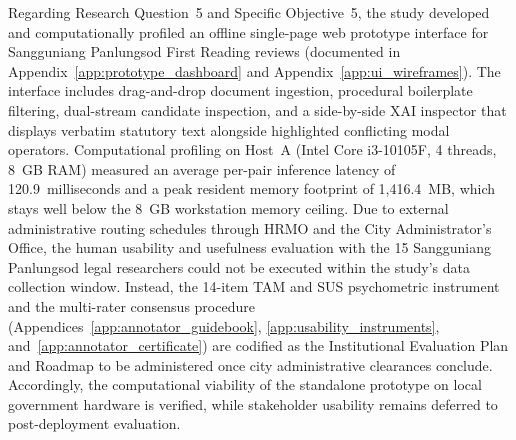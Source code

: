 Regarding Research Question~5 and Specific Objective~5, the study developed and computationally profiled an offline single-page web prototype interface for Sangguniang Panlungsod First Reading reviews (documented in Appendix~\ref{app:prototype_dashboard} and Appendix~\ref{app:ui_wireframes}). The interface includes drag-and-drop document ingestion, procedural boilerplate filtering, dual-stream candidate inspection, and a side-by-side XAI inspector that displays verbatim statutory text alongside highlighted conflicting modal operators. Computational profiling on Host~A (Intel Core i3-10105F, 4 threads, 8~GB RAM) measured an average per-pair inference latency of 120.9~milliseconds and a peak resident memory footprint of 1,416.4~MB, which stays well below the 8~GB workstation memory ceiling. Due to external administrative routing schedules through HRMO and the City Administrator's Office, the human usability and usefulness evaluation with the 15 Sangguniang Panlungsod legal researchers could not be executed within the study's data collection window. Instead, the 14-item TAM and SUS psychometric instrument and the multi-rater consensus procedure (Appendices~\ref{app:annotator_guidebook}, \ref{app:usability_instruments}, and~\ref{app:annotator_certificate}) are codified as the Institutional Evaluation Plan and Roadmap to be administered once city administrative clearances conclude. Accordingly, the computational viability of the standalone prototype on local government hardware is verified, while stakeholder usability remains deferred to post-deployment evaluation.

